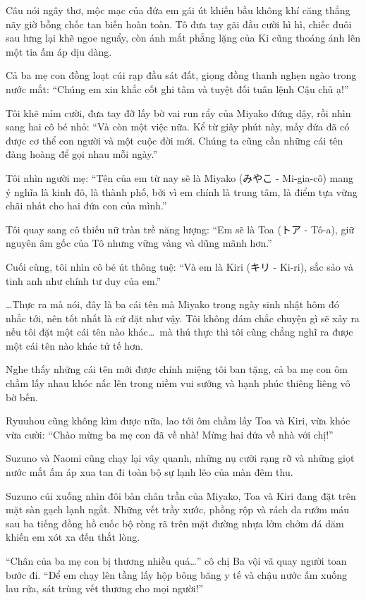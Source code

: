 \documentclass[../main.tex]{subfiles}
\begin{document}
Câu nói ngây thơ, mộc mạc của đứa em gái út khiến bầu không khí căng thẳng nãy giờ bỗng chốc tan biến hoàn toàn. Tô đưa tay gãi đầu cười hì hì, chiếc đuôi sau lưng lại khẽ ngoe nguẩy, còn ánh mắt phẳng lặng của Ki cũng thoáng ánh lên một tia ấm áp dịu dàng.

Cả ba mẹ con đồng loạt cúi rạp đầu sát đất, giọng đồng thanh nghẹn ngào trong nước mắt: ``Chúng em xin khắc cốt ghi tâm và tuyệt đối tuân lệnh Cậu chủ ạ!''

Tôi khẽ mỉm cười, đưa tay đỡ lấy bờ vai run rẩy của Miyako đứng dậy, rồi nhìn sang hai cô bé nhỏ: ``Và còn một việc nữa. Kể từ giây phút này, mấy đứa đã có được cơ thể con người và một cuộc đời mới. Chúng ta cũng cần những cái tên đàng hoàng để gọi nhau mỗi ngày.''

Tôi nhìn người mẹ: ``Tên của em từ nay sẽ là Miyako (みやこ - Mi-gia-cô) mang ý nghĩa là kinh đô, là thành phố, bởi vì em chính là trung tâm, là điểm tựa vững chãi nhất cho hai đứa con của mình.''

Tôi quay sang cô thiếu nữ tràn trề năng lượng: ``Em sẽ là Toa (トア - Tô-a), giữ nguyên âm gốc của Tô nhưng vững vàng và dũng mãnh hơn.''

Cuối cùng, tôi nhìn cô bé út thông tuệ: ``Và em là Kiri (キリ - Ki-ri), sắc sảo và tinh anh như chính tư duy của em.''

\dots Thực ra mà nói, đây là ba cái tên mà Miyako trong ngày sinh nhật hôm đó nhắc tới, nên tốt nhất là cứ đặt như vậy. Tôi không dám chắc chuyện gì sẽ xảy ra nếu tôi đặt một cái tên nào khác\dots\ mà thú thực thì tôi cũng chẳng nghĩ ra được một cái tên nào khác tử tế hơn.

Nghe thấy những cái tên mới được chính miệng tôi ban tặng, cả ba mẹ con ôm chầm lấy nhau khóc nấc lên trong niềm vui sướng và hạnh phúc thiêng liêng vô bờ bến.

Ryuuhou cũng không kìm được nữa, lao tới ôm chầm lấy Toa và Kiri, vừa khóc vừa cười: ``Chào mừng ba mẹ con đã về nhà! Mừng hai đứa về nhà với chị!''

Suzuno và Naomi cũng chạy lại vây quanh, những nụ cười rạng rỡ và những giọt nước mắt ấm áp xua tan đi toàn bộ sự lạnh lẽo của màn đêm thu.

Suzuno cúi xuống nhìn đôi bàn chân trần của Miyako, Toa và Kiri đang đặt trên mặt sàn gạch lạnh ngắt. Những vết trầy xước, phồng rộp và rách da rướm máu sau ba tiếng đồng hồ cuốc bộ ròng rã trên mặt đường nhựa lởm chởm đá dăm khiến em xót xa đến thắt lòng.

``Chân của ba mẹ con bị thương nhiều quá\dots'' cô chị Ba vội vã quay người toan bước đi. ``Để em chạy lên tầng lấy hộp bông băng y tế và chậu nước ấm xuống lau rửa, sát trùng vết thương cho mọi người!''
\end{document}
